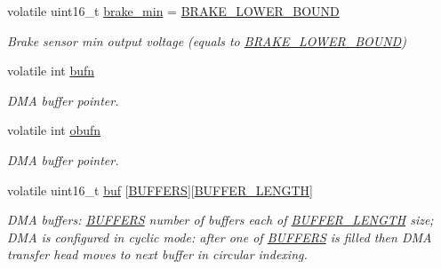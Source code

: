 \begin{DoxyCompactItemize}
volatile uint16\+\_\+t \mbox{\hyperlink{group___board__model__group_ga779ee9b904930e3cfb165e70edfecd02}{brake\+\_\+min}} = \mbox{\hyperlink{group___board__model__group_ga0aed20cafcc206360abda47b125432c7}{B\+R\+A\+K\+E\+\_\+\+L\+O\+W\+E\+R\+\_\+\+B\+O\+U\+ND}}
\begin{DoxyCompactList}\small\item\em Brake sensor min output voltage (equals to \mbox{\hyperlink{group___board__model__group_ga0aed20cafcc206360abda47b125432c7}{B\+R\+A\+K\+E\+\_\+\+L\+O\+W\+E\+R\+\_\+\+B\+O\+U\+ND}}) \end{DoxyCompactList}\item 
\mbox{\label{group___board__model__group_gad2658b77f345b15c03759c02d1ba0e81}} 
volatile int \mbox{\hyperlink{group___board__model__group_gad2658b77f345b15c03759c02d1ba0e81}{bufn}}
\begin{DoxyCompactList}\small\item\em D\+MA buffer pointer. \end{DoxyCompactList}\item 
\mbox{\label{group___board__model__group_gafef4d6ed48b3edc5f7a74defba82e7d8}} 
volatile int \mbox{\hyperlink{group___board__model__group_gafef4d6ed48b3edc5f7a74defba82e7d8}{obufn}}
\begin{DoxyCompactList}\small\item\em D\+MA buffer pointer. \end{DoxyCompactList}\item 
\mbox{\label{group___board__model__group_gaa785fe4a3446344207127079a33a9ea6}} 
volatile uint16\+\_\+t \mbox{\hyperlink{group___board__model__group_gaa785fe4a3446344207127079a33a9ea6}{buf}} \mbox{[}\mbox{\hyperlink{group___board__model__group_gaabe0f927d44a09f458bd5fe5ab4e2f7f}{B\+U\+F\+F\+E\+RS}}\mbox{]}\mbox{[}\mbox{\hyperlink{group___board__model__group_gaf7b7dc9a200cb1404c280bd500fd1551}{B\+U\+F\+F\+E\+R\+\_\+\+L\+E\+N\+G\+TH}}\mbox{]}
\begin{DoxyCompactList}\small\item\em D\+MA buffers\+: \mbox{\hyperlink{group___board__model__group_gaabe0f927d44a09f458bd5fe5ab4e2f7f}{B\+U\+F\+F\+E\+RS}} number of buffers each of \mbox{\hyperlink{group___board__model__group_gaf7b7dc9a200cb1404c280bd500fd1551}{B\+U\+F\+F\+E\+R\+\_\+\+L\+E\+N\+G\+TH}} size; D\+MA is configured in cyclic mode\+: after one of \mbox{\hyperlink{group___board__model__group_gaabe0f927d44a09f458bd5fe5ab4e2f7f}{B\+U\+F\+F\+E\+RS}} is filled then D\+MA transfer head moves to next buffer in circular indexing. \end{DoxyCompactList}\end{DoxyCompactItemize}


